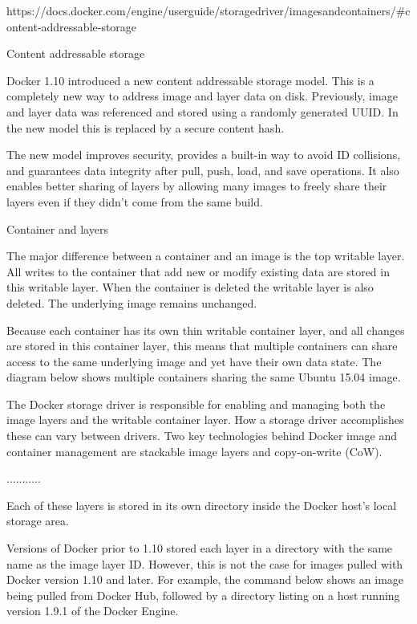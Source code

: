 
https://docs.docker.com/engine/userguide/storagedriver/imagesandcontainers/#content-addressable-storage


Content addressable storage

Docker 1.10 introduced a new content addressable storage model. This is a completely new way to address image and layer data on disk. Previously, image and layer data was referenced and stored using a randomly generated UUID. In the new model this is replaced by a secure content hash.

The new model improves security, provides a built-in way to avoid ID collisions, and guarantees data integrity after pull, push, load, and save operations. It also enables better sharing of layers by allowing many images to freely share their layers even if they didn’t come from the same build.


Container and layers

The major difference between a container and an image is the top writable layer. All writes to the container that add new or modify existing data are stored in this writable layer. When the container is deleted the writable layer is also deleted. The underlying image remains unchanged.

Because each container has its own thin writable container layer, and all changes are stored in this container layer, this means that multiple containers can share access to the same underlying image and yet have their own data state. The diagram below shows multiple containers sharing the same Ubuntu 15.04 image.

The Docker storage driver is responsible for enabling and managing both the image layers and the writable container layer. How a storage driver accomplishes these can vary between drivers. Two key technologies behind Docker image and container management are stackable image layers and copy-on-write (CoW).



...........


Each of these layers is stored in its own directory inside the Docker host’s local storage area.

Versions of Docker prior to 1.10 stored each layer in a directory with the same name as the image layer ID. However, this is not the case for images pulled with Docker version 1.10 and later. For example, the command below shows an image being pulled from Docker Hub, followed by a directory listing on a host running version 1.9.1 of the Docker Engine.



